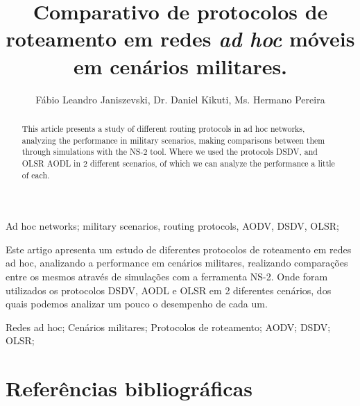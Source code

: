 \documentclass[12pt]{article}
\title{Comparativo de protocolos de roteamento em redes \textit{ad hoc} m\'oveis em cen\'arios militares.}
\author{
	F\'abio Leandro Janiszevski\inst{1}, 
	Dr. Daniel Kikuti\inst{1}, 
	Ms. Hermano Pereira\inst{2}
}
\begin{document}
\maketitle

\begin{abstract}
This article presents a study of different routing protocols in ad hoc networks, analyzing the performance in military scenarios, making comparisons between them through simulations with the NS-2 tool.
Where we used the protocols DSDV, and OLSR AODL in 2 different scenarios, of which we can analyze the performance a little of each.
\end{abstract}

\begin{keyWord}
Ad hoc networks; military scenarios, routing protocols, AODV, DSDV, OLSR;
\end{keyWord}

\begin{resumo}
Este artigo apresenta um estudo de diferentes protocolos de roteamento em redes ad hoc, analizando a performance em cen\'arios militares, realizando compara\c{c}\~oes entre os mesmos atrav\'es de simula\c{c}\~oes com a ferramenta NS-2. 
Onde foram utilizados os protocolos DSDV, AODL e OLSR em 2 diferentes cen\'arios, dos quais podemos analizar um pouco o desempenho de cada um.
\end{resumo}

\begin{palavraChave}
Redes ad hoc; Cen\'arios militares; Protocolos de roteamento; AODV; DSDV; OLSR;
\end{palavraChave}


\section{Refer\^encias bibliogr\'aficas}
%

\def\bibindent{0.5cm}
\renewcommand{\emph}{\textbf}

\end{document}
